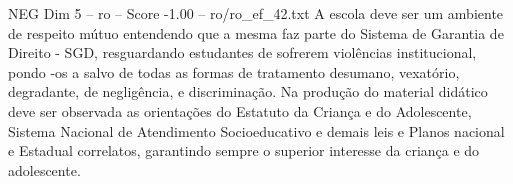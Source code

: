 \begin{textsample}{NEG Dim 5 – ro – Score -1.00 – ro/ro\_ef\_42.txt}
A escola deve ser um ambiente de respeito mútuo entendendo que a mesma faz parte do Sistema de Garantia de Direito - SGD, resguardando estudantes de sofrerem violências institucional, pondo -os a salvo de todas as formas de tratamento desumano, vexatório, degradante, de negligência, e discriminação.
Na produção do material didático deve ser observada as orientações do Estatuto da Criança e do Adolescente, Sistema Nacional de Atendimento Socioeducativo e demais leis e Planos nacional e Estadual correlatos, garantindo sempre o superior interesse da criança e do adolescente.

\end{textsample}
